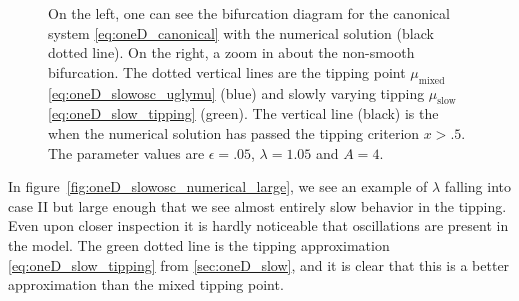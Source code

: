 \begin{figure}[H]
\begin{subfigure}{.5\textwidth}
 \caption{}
\end{subfigure}
\caption{On the left, one can see the bifurcation diagram for the canonical system \eqref{eq:oneD_canonical} with the numerical solution (black dotted line). On the right, a zoom in about the non-smooth bifurcation. The dotted vertical lines are the tipping point $\mu_{\text{mixed}}$ \eqref{eq:oneD_slowosc_uglymu} (blue) and slowly varying tipping $\mu_{\text{slow}}$ \eqref{eq:oneD_slow_tipping} (green). The vertical line (black) is the when the numerical solution has passed the tipping criterion $x>.5$. The parameter values are $\epsilon=.05$, $\lambda=1.05$ and $A=4$.}
\label{fig:oneD_slowosc_numerical_medium}
\end{figure}

\indent In figure~\ref{fig:oneD_slowosc_numerical_large}, we see an example of $\lambda$ falling into case II but large enough that we see almost entirely slow behavior in the tipping. Even upon closer inspection it is hardly noticeable that oscillations are present in the model. The green dotted line is the tipping approximation \eqref{eq:oneD_slow_tipping} from \autoref{sec:oneD_slow}, and it is clear that this is a better approximation than the mixed tipping point.

